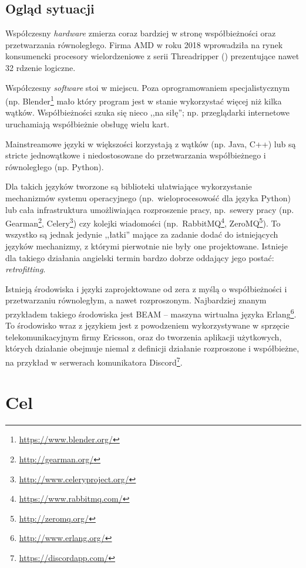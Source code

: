 \subsection{Ogląd sytuacji}

Współczesny \emph{hardware} zmierza coraz bardziej w stronę współbieżności oraz przetwarzania równoległego.
Firma AMD w roku 2018 wprowadziła na rynek konsumencki procesory wielordzeniowe z serii
Threadripper (\cite{AmdProductThreadripper}) prezentujące nawet 32 rdzenie logiczne.

Współczesny \emph{software} stoi w miejscu. Poza oprogramowaniem specjalistycznym (np.
Blender\footnote{\url{https://www.blender.org/}} mało który program jest w stanie wykorzystać więcej niż
kilka wątków. Współbieżności szuka się nieco ,,na siłę''; np. przeglądarki internetowe uruchamiają
współbieżnie obsługę wielu kart.

Mainstreamowe języki w większości korzystają z wątków (np. Java, C++) lub są stricte jednowątkowe i
niedostosowane do przetwarzania współbieżnego i równoległego (np. Python).

Dla takich języków tworzone są biblioteki ułatwiające wykorzystanie mechanizmów systemu operacyjnego
(np.~wieloprocesowość dla języka Python) lub cała infrastruktura umożliwiająca rozproszenie pracy,
np.~sewery pracy (np. Gearman\footnote{\url{http://gearman.org/}},
Celery\footnote{\url{http://www.celeryproject.org/}}) czy kolejki wiadomości
(np.~RabbitMQ\footnote{\url{https://www.rabbitmq.com/}}, ZeroMQ\footnote{\url{http://zeromq.org/}}).
To wszystko są jednak jedynie ,,łatki'' mające za zadanie dodać do istniejących języków mechanizmy, z którymi
pierwotnie nie były one projektowane. Istnieje dla takiego działania angielski termin bardzo dobrze oddający
jego postać: \emph{retrofitting}.

Istnieją środowiska i języki zaprojektowane od zera z myślą o współbieżności i przetwarzaniu równoległym, a
nawet rozproszonym.
Najbardziej znanym przykładem takiego środowiska jest BEAM -- maszyna wirtualna języka
Erlang\footnote{\url{http://www.erlang.org/}}. To środowisko wraz z językiem jest z powodzeniem wykorzystywane
w sprzęcie telekomunikacyjnym firmy Ericsson, oraz do tworzenia aplikacji użytkowych, których działanie
obejmuje niemal z definicji działanie rozproszone i współbieżne, na przykład w serwerach komunikatora
Discord\footnote{\url{https://discordapp.com/}}.

\section{Cel}

